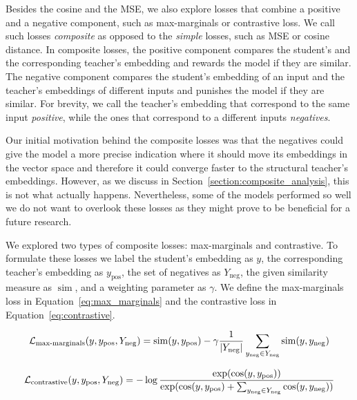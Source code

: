 Besides the cosine and the MSE, we also explore losses that combine a positive
and a negative component, such as max-marginals or contrastive loss. We call
such losses \emph{composite} as opposed to the \emph{simple} losses, such as
MSE or cosine distance. In composite losses, the positive component compares
the student's and the corresponding teacher's embedding and rewards the model
if they are similar. The negative component compares the student's embedding of
an input and the teacher's embeddings of different inputs and punishes the
model if they are similar. For brevity, we call the teacher's embedding that
correspond to the same input \emph{positive}, while the ones that correspond to
a different inputs \emph{negatives}.

Our initial motivation behind the composite losses was that the negatives could
give the model a more precise indication where it should move its embeddings in
the vector space and therefore it could converge faster to the structural
teacher's embeddings. However, as we discuss in
Section~\ref{section:composite_analysis}, this is not what actually happens.
Nevertheless, some of the models performed so well we do not want to overlook
these losses as they might prove to be beneficial for a future research.

We explored two types of composite losses: max-marginals and contrastive. To
formulate these losses we label the student's embedding as $y$, the
corresponding teacher's embedding as $y_{\text{pos}}$, the set of negatives as
$Y_{\text{neg}}$, the given similarity measure as $\operatorname{sim}$, and a
weighting parameter as $\gamma$. We define the max-marginals loss in
Equation~\ref{eq:max_marginals} and the contrastive loss in
Equation~\ref{eq:contrastive}.


\begin{equation}
  \mathcal{L}_{\text{max-marginals}}(y, y_\text{pos}, Y_\text{neg}) =
    \operatorname{sim}(y, y_\text{pos}) -
    \gamma \frac{1}{|Y_\text{neg}|} \sum_{y_\text{neg} \in Y_\text{neg}}
      \operatorname{sim}(y, y_\text{neg})
  \label{eq:max_marginals}
\end{equation}

\begin{equation}
  \mathcal{L}_{\text{contrastive}}(y, y_\text{pos}, Y_\text{neg}) =
    -\log \frac{
      \exp(\cos(y, y_\text{pos}))
    }{
      \exp(
        \cos(y, y_\text{pos}) +
        \sum_{y_\text{neg} \in Y_\text{neg}} \cos(y, y_\text{neg})
      )
    }
  \label{eq:contrastive}
\end{equation}

